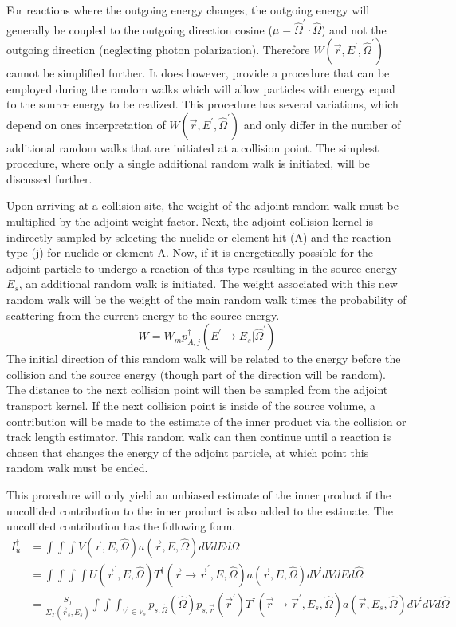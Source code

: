 For reactions where the outgoing energy changes, the outgoing energy will 
generally be coupled to the outgoing direction cosine 
($\mu = \hat{\Omega}^{'}\cdot\hat{\Omega}$) and not the outgoing direction 
(neglecting photon polarization). Therefore $W(\vec{r},E^{'},\hat{\Omega}^{'})$ 
cannot be simplified further. It does however, provide a procedure that
can be employed during the random walks which will allow particles with energy
equal to the source energy to be realized. This procedure has several
variations, which depend on ones interpretation of 
$W(\vec{r},E^{'},\hat{\Omega}^{'})$ and only differ in the number of additional
random walks that are initiated at a collision point. The simplest procedure, 
where only a single additional random walk is initiated, will be discussed 
further. 

Upon arriving at a collision site, the weight of the adjoint random
walk must be multiplied by the adjoint weight factor. Next, the adjoint
collision kernel is indirectly sampled by selecting the nuclide or element hit 
(A) and the reaction type (j) for nuclide or element A. Now, if it is 
energetically possible for the adjoint particle to undergo a reaction of this 
type resulting in the source energy $E_s$, an additional random walk is 
initiated. The weight associated with this new random walk will be the weight 
of the main random walk times the probability of scattering from the current 
energy to the source energy. 
\begin{equation*}
  W = W_mp_{A,j}^{\dagger}(E^{'} \to E_s|\hat{\Omega}^{'}) 
\end{equation*}
The initial direction of this random walk will be related to the energy before
the collision and the source energy (though part of the direction will be 
random). The distance to the next collision point will then be sampled from
the adjoint transport kernel. If the next collision point is inside of the 
source volume, a contribution will be made to the estimate of the inner product
via the collision or track length estimator. This random walk can then continue 
until a reaction is chosen that changes the energy of the adjoint particle, at 
which point this random walk must be ended. 

This procedure will only yield an unbiased estimate of the inner product if the 
uncollided contribution to the inner product is also added to the estimate. 
The uncollided contribution has the following form.
\begin{align}
  I_u^{\dagger} & = \int\int\int V(\vec{r},E,\hat{\Omega})
  a(\vec{r},E,\hat{\Omega}) dVdEd\hat{\Omega} \nonumber \\
  & = \int\int\int\int U(\vec{r}^{'},E,\hat{\Omega})
  T^{\dagger}(\vec{r} \to \vec{r}^{'},E,\hat{\Omega}) a(\vec{r},E,\hat{\Omega})
  dV^{'}dVdEd\hat{\Omega} \nonumber \\
  & = \frac{S_0}{\Sigma_T(\vec{r}_s,E_s)} \int\int\int_{V^{'} \in V_s} 
  p_{s,\hat{\Omega}}(\hat{\Omega}) p_{s,\vec{r}}(\vec{r}^{'})
  T^{\dagger}(\vec{r} \to \vec{r}^{'},E_s,\hat{\Omega}) a(\vec{r},E_s,\hat{\Omega})
  dV^{'}dVd\hat{\Omega} \nonumber
\end{align}

